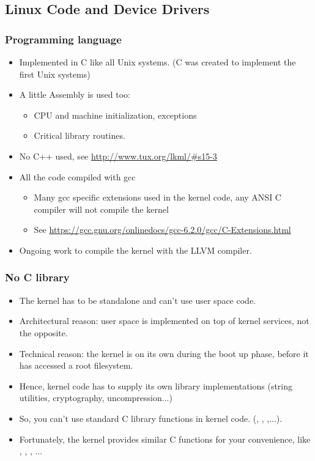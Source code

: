 \subsection{Linux Code and Device Drivers}

\begin{frame}
  \frametitle{Programming language}
  \begin{itemize}
  \item Implemented in C like all Unix systems. (C was created to
    implement the first Unix systems)
  \item A little Assembly is used too:
    \begin{itemize}
    \item CPU and machine initialization, exceptions
    \item Critical library routines.
    \end{itemize}
  \item No C++ used, see \url{http://www.tux.org/lkml/\#s15-3}
  \item All the code compiled with gcc
    \begin{itemize}
    \item Many gcc specific extensions used in the kernel code, any
      ANSI C compiler will not compile the kernel
    \item See
      \url{https://gcc.gnu.org/onlinedocs/gcc-6.2.0/gcc/C-Extensions.html}
    \end{itemize}
    \item Ongoing work to compile the kernel with the LLVM compiler.
  \end{itemize}
\end{frame}

\begin{frame}
  \frametitle{No C library}
  \begin{itemize}
  \item The kernel has to be standalone and can't use user space code.
  \item Architectural reason: user space is implemented on top of kernel services, not the
    opposite.  
  \item Technical reason: the kernel is on its own during the boot up
    phase, before it has accessed a root filesystem.
  \item Hence, kernel code has to supply its own library implementations
    (string utilities, cryptography, uncompression...)
  \item So, you can't use standard C library functions in kernel code.
    (, , ,...).
  \item Fortunately, the kernel provides similar C functions for your
    convenience, like , ,
    , ...
  \end{itemize}
\end{frame}

